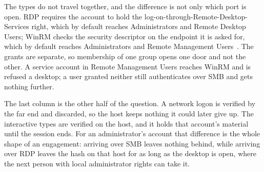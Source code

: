 The types do not travel together, and the difference is not only which port is open. RDP requires the
account to hold the log-on-through-Remote-Desktop-Services right, which by default reaches
Administrators and Remote Desktop Users; WinRM checks the security descriptor on the endpoint it is
asked for, which by default reaches Administrators and Remote Management
Users~\cite{ms-rdp-logon-right,ms-psremoting-requirements}. The grants are separate, so membership of
one group opens one door and not the other. A service account in Remote Management Users reaches WinRM
and is refused a desktop; a user granted neither still authenticates over SMB and gets nothing
further.

The last column is the other half of the question. A network logon is verified by the far end and
discarded, so the host keeps nothing it could later give up. The interactive types are verified on the
host, and it holds that account's material until the session ends. For an administrator's account
that difference is the whole shape of an engagement: arriving over SMB leaves nothing behind, while
arriving over RDP leaves the hash on that host for as long as the desktop is open, where the next
person with local administrator rights can take it.

